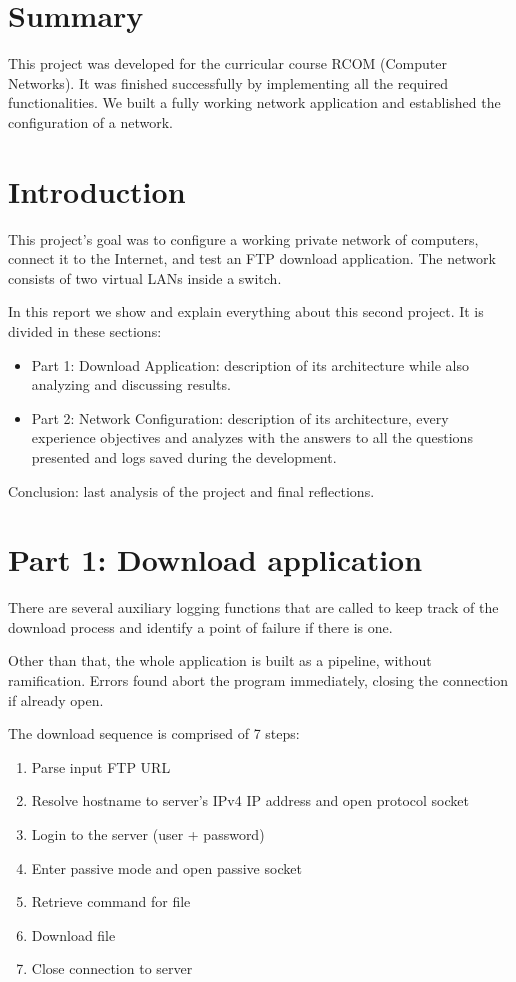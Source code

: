 \documentclass[compilation.tex]{subfiles}
\begin{document}
\section{Summary}
\label{sec:summary}

This project was developed for the curricular course RCOM (Computer Networks). It was finished successfully by implementing all the required functionalities. We built a fully working network application and established the configuration of a network.

\section{Introduction}
\label{sec:introduction}

This project's goal was to configure a working private network of computers, connect it to the Internet, and test an FTP download application. The network consists of two virtual LANs inside a switch.

In this report we show and explain everything about this second project. It is divided in these sections:

\begin{itemize}
	\item Part 1: Download Application: description of its architecture while also analyzing and discussing results.
	\item Part 2: Network Configuration: description of its architecture, every experience objectives and analyzes with the answers to all the questions presented and logs saved during the development.
\end{itemize}

Conclusion: last analysis of the project and final reflections.

\section{Part 1: Download application}
\label{sec:downloadapp}

There are several auxiliary logging functions that are called to keep track of the download process and identify a point of failure if there is one.

Other than that, the whole application is built as a pipeline, without ramification. Errors found abort the program immediately, closing the connection if already open.

The download sequence is comprised of 7 steps:

\begin{enumerate}[noitemsep]
\item Parse input FTP URL
\item Resolve hostname to server's IPv4 IP address and open protocol socket
\item Login to the server (user + password)
\item Enter passive mode and open passive socket
\item Retrieve command for file
\item Download file
\item Close connection to server
\end{enumerate}
\end{document}
